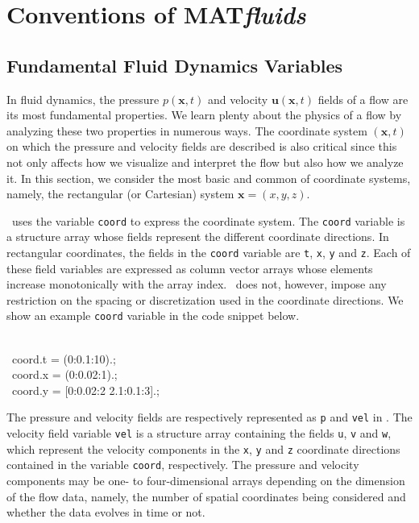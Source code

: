 \documentclass[10pt, twoside]{book}
\begin{document}
	
	\mainmatter
	
	\chapter{\label{chp:Convention}Conventions of MAT\textit{fluids}}
		
		\section{\label{sec:Common}Fundamental Fluid Dynamics Variables}
			
			In fluid dynamics, the pressure $p\left(\mathbf{x},t\right)$ and velocity $\mathbf{u}\left(\mathbf{x},t\right)$ fields of a flow are its most fundamental properties. We learn plenty about the physics of a flow by analyzing these two properties in numerous ways. The coordinate system $\left(\mathbf{x},t\right)$ on which the pressure and velocity fields are described is also critical since this not only affects how we visualize and interpret the flow but also how we analyze it. In this section, we consider the most basic and common of coordinate systems, namely, the rectangular (or Cartesian) system $\mathbf{x} = \left(x, y, z\right)$.
			
			\MATfluids\ uses the variable \texttt{coord} to express the coordinate system. The \texttt{coord} variable is a structure array whose fields represent the different coordinate directions. In rectangular coordinates, the fields in the \texttt{coord} variable are \texttt{t}, \texttt{x}, \texttt{y} and \texttt{z}. Each of these field variables are expressed as column vector arrays whose elements increase monotonically with the array index. \MATfluids\ does not, however, impose any restriction on the spacing or discretization used in the coordinate directions. We show an example \texttt{coord} variable in the code snippet below.
			\begin{code}
				\\[-8.00pt]
				\MATcommand\ coord.t = (0:0.1:10).\MATtrans;\\
				\MATcommand\ coord.x = (0:0.02:1).\MATtrans;\\
				\MATcommand\ coord.y = [0:0.02:2 2.1:0.1:3].\MATtrans;\\[3.00pt]
			\end{code}
			
			The pressure and velocity fields are respectively represented as \texttt{p} and \texttt{vel} in \MATfluids. The velocity field variable \texttt{vel} is a structure array containing the fields \texttt{u}, \texttt{v} and \texttt{w}, which represent the velocity components in the \texttt{x}, \texttt{y} and \texttt{z} coordinate directions contained in the variable \texttt{coord}, respectively. The pressure and velocity components may be one- to four-dimensional arrays depending on the dimension of the flow data, namely, the number of spatial coordinates being considered and whether the data evolves in time or not.
			
\end{document}
